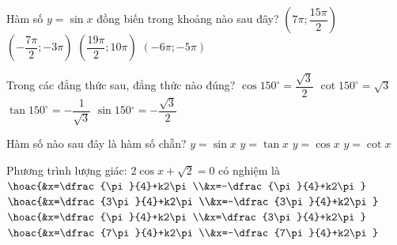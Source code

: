 \begin{ex}%
	Hàm số $y=\sin x$ đồng biến trong  khoảng nào sau đây?
	 \choice
		 {$\left(7\pi; \dfrac{15\pi}{2}\right)$}
		{$\left(-\dfrac{7\pi}{2}; -3\pi\right)$} 
		{\True  $\left(\dfrac{19\pi}{2}; 10\pi\right)$}
		{$\left(-6\pi; -5\pi \right)$} 
\end{ex}

\begin{ex}%
	Trong  các đẳng thức sau, đẳng thức nào đúng?
	 \choice
		 {$\cos 150^\circ =\dfrac{\sqrt{3}}{2} $}
		{$\cot 150^\circ =\sqrt{3} $} 
		{\True $\tan 150^\circ  =-\dfrac{1}{\sqrt{3}} $}
		 {$\sin 150{^\circ}=-\dfrac{\sqrt{3}}{2} $}
\end{ex}

\begin{ex}%
	 Hàm số nào sau đây là hàm số chẵn?
	 \choice
		{$y=\sin  x$}
		{$y=\tan x$} 
		{\True $y=\cos  x$}
		 {$y=\cot x$}
\end{ex}

\begin{ex}%
	Phương trình  lượng giác: $2\cos x+\sqrt{2}=0$ có nghiệm là
	\choice 
		 {$\hoac{&x=\dfrac{\pi}{4}+k2\pi\\&x=-\dfrac{\pi}{4}+k2\pi}$}
		{\True  $\hoac{&x=\dfrac{3\pi}{4}+k2\pi\\&x=-\dfrac{3\pi}{4}+k2\pi}$}
		{$\hoac{&x=\dfrac{\pi}{4}+k2\pi\\&x=\dfrac{3\pi}{4}+k2\pi}$} 
		{$\hoac{&x=\dfrac{7\pi}{4}+k2\pi\\&x=-\dfrac{7\pi}{4}+k2\pi}$} 
\end{ex}

